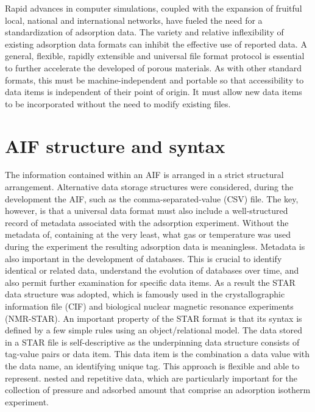 \documentclass[journal=langd5,manuscript=article]{achemso}
\begin{document}
Rapid advances in computer simulations, coupled with the expansion of fruitful local, national and international networks, have fueled the need for a standardization of adsorption data.
The variety and relative inflexibility of existing adsorption data formats can inhibit the effective use of reported data.
A general, flexible, rapidly extensible and universal file format protocol is essential to further accelerate the developed of porous materials.
As with other standard formats, this must be machine-independent and portable so that accessibility to data items is independent of their point of origin.
It must allow new data items to be incorporated without the need to modify existing files.

\section{AIF structure and syntax}
The information contained within an AIF is arranged in a strict structural arrangement.
Alternative data storage structures were considered, during the development the AIF,  such as the comma-separated-value (CSV) file.
The key, however, is that a universal data format must also include a well-structured record of metadata associated with the adsorption experiment.
Without the metadata of, containing at the very least, what gas or temperature was used during the experiment the resulting adsorption data is meaningless.
Metadata is also important in the development of databases.
This is crucial to identify identical or related data, understand the evolution of databases over time, and also permit further examination for specific data items.
As a result the STAR data structure was adopted, which is famously used in the crystallographic information file (CIF) and biological nuclear magnetic resonance experiments (NMR-STAR).
An important property of the STAR format is that its syntax is defined by a few simple rules using an object/relational model.
The data stored in a STAR file is self-descriptive as the underpinning data structure consists of tag-value pairs or data item.
This data item is the combination a data value with the data name, an identifying unique tag.
This approach is flexible and able to represent. nested and repetitive data, which are particularly important for the collection of pressure and adsorbed amount that comprise an adsorption isotherm experiment.
\end{document}
